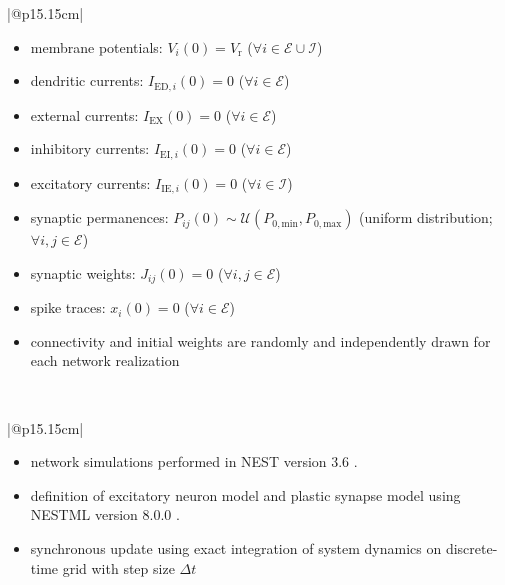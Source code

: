 \documentclass[10pt,a4paper,twoside,american]{article}
\newcommand{\dtsim}{\Delta t}
\newcommand{\J}{J}                          %
\begin{document}
\begin{table}
\begin{tabular}{|@{\hspace*{1mm}}p{15.15cm}|}
   \\
    \begin{itemize}
    \item membrane potentials: $V_i(0)=V_\text{r}$ ($\forall{}i\in\mathcal{E}\cup\mathcal{I}$)
    \item dendritic currents: $I_{\text{ED},i}(0)=0$ ($\forall{}i\in\mathcal{E}$)
    \item external currents: $I_{\text{EX}}(0)=0$ ($\forall{}i\in\mathcal{E}$)
    \item inhibitory currents: $I_{\text{EI},i}(0)=0$ ($\forall{}i\in\mathcal{E}$)
    \item excitatory currents: $I_{\text{IE},i}(0)=0$ ($\forall{}i\in\mathcal{I}$)
    \item synaptic permanences: $P_{ij}(0)\sim\mathcal{U}(P_{0,\text{min}},P_{0,\text{max}})$ (uniform distribution; $\forall{}i,j\in\mathcal{E}$)
    \item synaptic weights: $\J_{ij}(0)=0$ ($\forall{}i,j\in\mathcal{E}$)
    \item spike traces: $x_i(0)=0$ ($\forall{}i\in\mathcal{E}$)
    \item connectivity and initial weights are randomly and independently drawn for each network realization
    \end{itemize}\\
    \hline
  \end{tabular}
 \begin{tabular}{|@{\hspace*{1mm}}p{15.15cm}|}
  \\
  \hline
  \begin{itemize}
  \item network simulations performed in NEST \citep{Gewaltig_07_11204} version 3.6 \citep{Nest360}.
  \item definition of excitatory neuron model and plastic synapse model using NESTML \citep{Plotnikov16_93,Linssen25_1544143} version 8.0.0 \citep{Linssen24_nestml8.0.0}.
  \item synchronous update using exact integration of system dynamics on discrete-time grid with step size $\dtsim$ \cite{Rotter99a}
  \end{itemize}
  \\
  \hline
\end{tabular}
\caption{Description of the initial conditions and simulation details. Parameter values are given in \cref{tab:Model-parameters}.}
\label{tab:Model-description-initcond}
\end{table}
\end{document}

